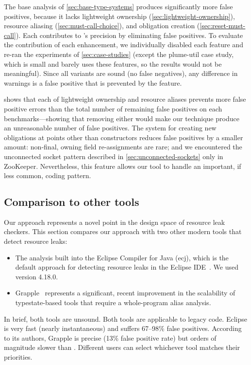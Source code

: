 The base analysis of \cref{sec:base-type-systems} produces significantly
more false positives, because it lacks 
lightweight ownership (\cref{sec:lightweight-ownership}),
resource aliasing (\cref{sec:must-call-choice}), and
obligation creation (\cref{sec:reset-must-call}).
Each contributes to \tool's precision by eliminating false positives.
To evaluate the contribution of each enhancement, we individually disabled each
feature and re-ran the experiments of \cref{sec:case-studies}
(except the plume-util case study, which is small and
barely uses these features, so the results would not be meaningful).
Since all variants are sound (no false
negatives), any difference in warnings is a false positive that is prevented
by the feature.

 shows that each of lightweight
ownership and resource aliases prevents more false positive errors than the total number
of remaining false positives on each benchmarks---showing that removing either
would make our technique produce an unreasonable number of false positives.
The system for creating new obligations at points other than constructors reduces
false positives by a smaller amount: non-final, owning field re-assignments are rare;
and we encountered the unconnected socket pattern described in \cref{sec:unconnected-sockets}
only in ZooKeeper. Nevertheless, this feature allows our tool to handle an
important, if less common, coding pattern.

\subsection{Comparison to other tools}
\label{sec:compare}

Our approach represents a novel point in the design space of resource leak checkers.
%
This section compares our approach with two other modern tools that detect resource leaks:
\begin{itemize}
\item The analysis built into the Eclipse Compiler for Java (ecj), which is the default approach
  for detecting resource leaks in the Eclipse IDE~\cite{ecj-resource-leak}.
  We used version 4.18.0.
\item Grapple~\cite{zuo2019grapple} represents a significant, recent
  improvement in the scalability of typestate-based tools that require a whole-program alias analysis.
\end{itemize}
In brief, both tools are unsound.
Both tools are applicable to legacy code. %
Eclipse is very fast (nearly instantaneous) and suffers 67--98\% false
positives. %
According to its authors, Grapple is precise (13\% false positive rate) but orders
of magnitude slower than \tool.
Different users can select whichever tool matches
their priorities.



